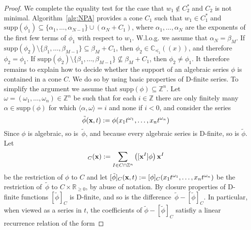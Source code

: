 \documentclass[a4paper,draft]{amsart}
\theoremstyle{definition}
\begin{document}
\begin{proof}
We complete the equality test for the case that $w_1\notin C_2^*$ and $C_2$ is not minimal. Algorithm~\ref{alg:NPA} provides a cone $C_1$ such that $w_1\in C_1^*$ and $\mathrm{supp}(\phi_1)\subseteq \{\alpha_1,\dots,\alpha_{N-1}\}\cup (\alpha_N+C_1)$, where $\alpha_1, \dots,\alpha_N$ are the exponents of the first few terms of $\phi_1$ with respect to $w_1$. W.l.o.g. we assume that $\alpha_N = \beta_M$. If $\mathrm{supp}(\phi_2)\setminus\{\beta_1,\dots,\beta_{M-1}\}\subseteq \beta_M + C_1$, then $\phi_2\in\mathbb{C}_{\preceq_1}((x))$, and therefore $\phi_2 = \phi_1$. If $\mathrm{supp}(\phi_2)\setminus\{\beta_1,\dots,\beta_{M-1}\}\nsubseteq \beta_M + C_1$, then $\phi_2 \neq \phi_1$. It therefore remains to explain how to decide whether the support of an algebraic series $\phi$ is contained in a cone $C$. 
We do so by using basic properties of D-finite series. To simplify the argument we assume that $\mathrm{supp}(\phi)\subseteq \mathbb{Z}^n$. Let $\omega=(\omega_1,\dots,\omega_n)\in\mathbb{Z}^n$ be such that for each $i\in\mathbb{Z}$ there are only finitely many $\alpha\in\mathrm{supp}(\phi)$ for which $\langle \alpha, \omega\rangle = i$ and none if $i< 0$, and consider the series 
\begin{equation*}
\tilde{\phi} (\bold{x},t) := \phi (x_1 t^{\omega_1},\dots, x_n t^{\omega_n} ) %
\end{equation*}
Since $\phi$ is algebraic, so is~$\tilde{\phi}$, and because every algebraic series is D-finite, so is $\tilde{\phi}$. 
Let
\begin{equation*}
[\phi]_C(\bold{x}) := \sum_{I\in C\cap \mathbb{Z}^n} \left([\bold{x}^I] \phi\right) \bold{x}^I
\end{equation*}
be the restriction of $\phi$ to $C$ and let $[\tilde{\phi}]_C(\bold{x},t) := [\phi]_C(x_1t^{\omega_1},\dots,x_n t^{\omega_n})$ be the restriction of~$\tilde{\phi}$ to $C\times \mathbb{R}_{\geq 0}$, by abuse of notation.
By closure properties of D-finite functions $[\tilde{\phi}]_C$ is D-finite, and so is the difference~$\tilde{\phi} - [\tilde{\phi}]_C$. In particular, when viewed as a series in $t$, the coefficients of $\tilde{\phi} - [\tilde{\phi}]_C$ satisfiy a linear recurrence relation of the form 

\end{proof}
\end{document}
